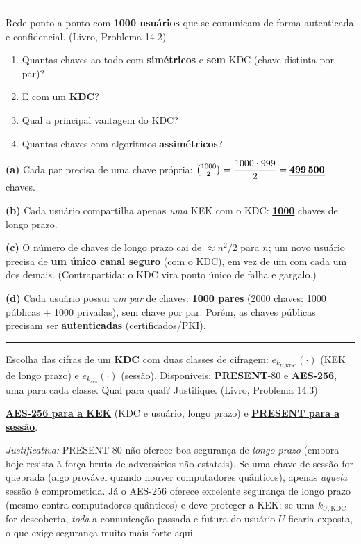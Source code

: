 \documentclass[11pt,a4paper]{article}
\newcommand{\livro}[1]{{\footnotesize\color{black!50}(Livro, Problema #1)}}
\newcommand{\alert}[1]{\textbf{\uline{#1}}}
\newcommand{\exercicio}[1]{%
    \Needspace{8\baselineskip}%
    \par\vspace{1.2em}
    \noindent
    {\color{black!55}\rule[-0.25em]{3pt}{1.6em}}%
    \hspace{0.6em}{\Large\bfseries Exerc\'{i}cio #1}
    \par\vspace{-0.4em}
    \noindent{\color{black!35}\rule{\textwidth}{0.4pt}}
    \par\vspace{0.35em}
}
\newenvironment{resposta}{%
    \begin{respostabox}
    \color{red!70!black}\sloppy
}{%
    \end{respostabox}
}
\begin{document}
\exercicio{2}
Rede ponto-a-ponto com \textbf{1000 usu\'{a}rios} que se comunicam de forma autenticada e confidencial. \livro{14.2}
\begin{enumerate}[label=(\alph*)]
    \item Quantas chaves ao todo com \textbf{sim\'{e}tricos} e \textbf{sem} KDC (chave distinta por par)?
    \item E com um \textbf{KDC}?
    \item Qual a principal vantagem do KDC?
    \item Quantas chaves com algoritmos \textbf{assim\'{e}tricos}?
\end{enumerate}
\begin{resposta}
\textbf{(a)} Cada par precisa de uma chave pr\'{o}pria: $\binom{1000}{2} = \dfrac{1000 \cdot 999}{2} = \alert{499\,500}$ chaves.

\textbf{(b)} Cada usu\'{a}rio compartilha apenas \emph{uma} KEK com o KDC: \alert{1000} chaves de longo prazo.

\textbf{(c)} O n\'{u}mero de chaves de longo prazo cai de $\approx n^2/2$ para $n$; um novo usu\'{a}rio precisa de \alert{um \'{u}nico canal seguro} (com o KDC), em vez de um com cada um dos demais. (Contrapartida: o KDC vira ponto \'{u}nico de falha e gargalo.)

\textbf{(d)} Cada usu\'{a}rio possui \emph{um par} de chaves: \alert{1000 pares} (2000 chaves: 1000 p\'{u}blicas $+$ 1000 privadas), sem chave por par. Por\'{e}m, as chaves p\'{u}blicas precisam ser \textbf{autenticadas} (certificados/PKI).
\end{resposta}

\exercicio{3}
Escolha das cifras de um \textbf{KDC} com duas classes de cifragem: $e_{k_{U,\text{KDC}}}(\cdot)$ (KEK de longo prazo) e $e_{k_{ses}}(\cdot)$ (sess\~{a}o). Dispon\'{i}veis: \textbf{PRESENT}-80 e \textbf{AES-256}, uma para cada classe. Qual para qual? Justifique. \livro{14.3}
\begin{resposta}
\alert{AES-256 para a KEK} (KDC e usu\'{a}rio, longo prazo) e \alert{PRESENT para a sess\~{a}o}.

\emph{Justificativa:} PRESENT-80 n\~{a}o oferece boa seguran\c{c}a de \emph{longo prazo} (embora hoje resista \`{a} for\c{c}a bruta de advers\'{a}rios n\~{a}o-estatais). Se uma chave de sess\~{a}o for quebrada (algo prov\'{a}vel quando houver computadores qu\^{a}nticos), apenas \emph{aquela} sess\~{a}o \'{e} comprometida. J\'{a} o AES-256 oferece excelente seguran\c{c}a de longo prazo (mesmo contra computadores qu\^{a}nticos) e deve proteger a KEK: se uma $k_{U,\text{KDC}}$ for descoberta, \emph{toda} a comunica\c{c}\~{a}o passada e futura do usu\'{a}rio $U$ ficaria exposta, o que exige seguran\c{c}a muito mais forte aqui.
\end{resposta}
\end{document}
